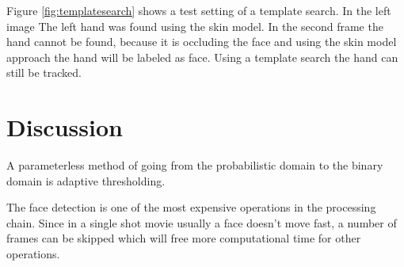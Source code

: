 Figure \ref{fig:templatesearch} shows a test setting of a template search. In the left image The left hand was found using the skin model. In the second frame the hand cannot be found, because it is occluding the face and using the skin model approach the hand will be labeled as face. Using a template search the hand can still be tracked.


\section{Discussion}

A parameterless method of going from the probabilistic domain to the binary domain is adaptive thresholding.

The face detection is one of the most expensive operations in the processing chain. Since in a single shot movie usually a face doesn't move fast, a number of frames can be skipped which will free more computational time for other operations.

